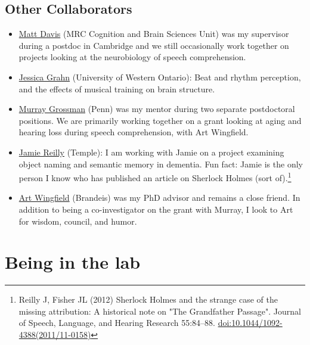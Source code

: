 \documentclass[letterpaper,12pt,oneside]{memoir}
\begin{document}
\section{Other Collaborators}
\begin{itemize}

\item{\href{http://www.mrc-cbu.cam.ac.uk/people/matt.davis/}{Matt Davis} (MRC Cognition and Brain Sciences Unit) was my supervisor during a postdoc in Cambridge and we still occasionally work together on projects looking at the neurobiology of speech comprehension.}

\item{\href{http://www.jessicagrahn.com}{Jessica Grahn} (University of Western Ontario): Beat and rhythm perception, and the effects of musical training on brain structure.}

\item{\href{http://ftd.med.upenn.edu/}{Murray Grossman} (Penn) was my mentor during two separate postdoctoral positions. We are primarily working together on a grant looking at aging and hearing loss during speech comprehension, with Art Wingfield.}

\item{\href{http://www.reilly-coglab.com}{Jamie Reilly} (Temple): I am working with Jamie on a project examining object naming and semantic memory in dementia. Fun fact: Jamie is the only person I know who has published an article on Sherlock Holmes (sort of).\footnote{Reilly J, Fisher JL (2012) Sherlock Holmes and the strange case of the missing attribution: A historical note on "The Grandfather Passage". Journal of Speech, Language, and Hearing Research 55:84--88. \href{http://dx.doi.org/10.1044/1092-4388(2011/11-0158)}{doi:10.1044/1092-4388(2011/11-0158)}}}

\item{\href{http://www.bio.brandeis.edu/faculty/wingfield.html}{Art Wingfield} (Brandeis) was my PhD advisor and remains a close friend. In addition to being a co-investigator on the grant with Murray, I look to Art for wisdom, council, and humor.}
\end{itemize}



\chapter{Being in the lab}

\end{document}
